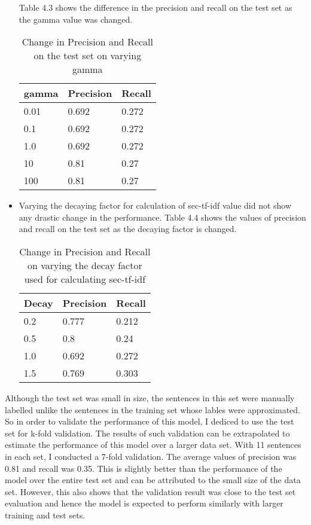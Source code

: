 \begin{itemize}
Table 4.3 shows the difference in the precision and recall on the test set as the gamma value was changed.
\begin{table}[h]
\centering
\caption{Change in Precision and Recall on the test set on varying gamma}
\begin{tabular}{|l|l|l|}
\hline
gamma & Precision & Recall \\ \hline
0.01  & 0.692     & 0.272  \\ \hline
0.1   & 0.692     & 0.272  \\ \hline
1.0   & 0.692     & 0.272  \\ \hline
10    & 0.81      & 0.27   \\ \hline
100   & 0.81      & 0.27   \\ \hline
\end{tabular}
\end{table}
\item Varying the decaying factor for calculation of sec-tf-idf value did not show any drastic change in the performance.
Table 4.4 shows the values of precision and recall on the test set as the decaying factor is changed.
\begin{table}[h]
\centering
\caption{Change in Precision and Recall on varying the decay factor used for calculating sec-tf-idf}
\begin{tabular}{|l|l|l|}
\hline
Decay & Precision & Recall \\ \hline
0.2   & 0.777     & 0.212  \\ \hline
0.5   & 0.8       & 0.24   \\ \hline
1.0   & 0.692     & 0.272  \\ \hline
1.5   & 0.769     & 0.303  \\ \hline
\end{tabular}
\end{table}
\end{itemize}

Although the test set was small in size, the sentences in this set were manually labelled unlike the sentences in the training set whose lables were approximated.
So in order to validate the performance of this model, I dediced to use the test set for k-fold validation.
The results of such validation can be extrapolated to estimate the performance of this model over a larger data set.
With 11 sentences in each set, I conducted a 7-fold validation.
The average values of precision was 0.81 and recall was 0.35.
This is slightly better than the performance of the  model over the entire test set and can be attributed to the small size of the data set.
However, this also shows that the validation result was close to the test set evaluation and hence the model is expected to perform similarly with larger training and test sets.